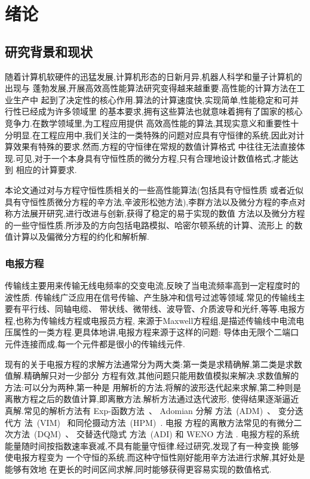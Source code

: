 \chapter{绪论}

\section{研究背景和现状}

随着计算机软硬件的迅猛发展,计算机形态的日新月异,机器人科学和量子计算机的出现与
蓬勃发展,开展高效高性能算法研究变得越来越重要.高性能的计算方法在工业生产中
起到了决定性的核心作用.算法的计算速度快,实现简单,性能稳定和可并行性已经成为许多领域里
的基本要求,拥有这些算法也就意味着拥有了国家的核心竞争力.在数学领域里,为工程应用提供
高效高性能的算法,其现实意义和重要性十分明显.在工程应用中,我们关注的一类特殊的问题对应具有守恒律的系统,因此对计算效果有特殊的要求.然而,方程的守恒律在常规的数值计算格式
中往往无法直接体现.可见,对于一个本身具有守恒性质的微分方程,只有合理地设计数值格式,才能达到
相应的计算要求.

本论文通过对与方程守恒性质相关的一些高性能算法(包括具有守恒性质
或者近似具有守恒性质微分方程的辛方法,辛波形松弛方法),李群方法以及微分方程的李点对称方法展开研究,进行改进与创新,获得了稳定的易于实现的数值
方法以及微分方程的一些守恒性质.所涉及的方向包括电路模拟、哈密尔顿系统的计算、流形上
的数值计算以及偏微分方程的约化和解析解.

\subsection{电报方程}

传输线主要用来传输无线电频率的交变电流,反映了当电流频率高到一定程度时的波性质.
传输线广泛应用在信号传输、产生脉冲和信号过滤等领域.常见的传输线主要有平行线、同轴电缆、
带状线、微带线、波导管、介质波导和光纤,等等.电报方程,也称为传输线方程或电报员方程,
来源于Maxwell方程组,是描述传输线中电流电压属性的一类方程.更具体地讲,电报方程来源于这样的问题:
导体由无限个二端口元件连接而成,每一个元件都是很小的传输线元件.

现有的关于电报方程的求解方法通常分为两大类:第一类是求精确解,第二类是求数值解.精确解只对一少部分
方程有效,其他问题只能用数值模拟来解决.求数值解的方法:可以分为两种,第一种是
用解析的方法,将解的波形迭代起来求解,第二种则是离散方程之后的数值计算,即离散方法.解析方法通过迭代波形,
使得结果逐渐逼近真解.常见的解析方法有 Exp-函数方法~\cite{naher2011exp}、 Adomian 分解
方法~(ADM)~\cite{adomian1988areview,sheikholeslami2012analytical}、 变分迭代方
法~(VIM)~\cite{wu2013variational} 和同伦摄动方法~(HPM)~\cite{sheikholeslami2012homotopy}. 电报
方程的离散方法常见的有微分二次方法~(DQM)~\cite{jiwari2012numerical}、 交替迭代隐式
方法~(ADI) \cite{cui2013convergence} 和 WENO 方法 \cite{borges2008improved,shen2014improvement}.
电报方程的系统能量随时间按指数速率衰减,不具有能量守恒律.经过研究,发现了有一种变换 \cite{polyanin2001handbook} 能够使电报方程变为
一个守恒的系统,而这种守恒性刚好能用辛方法进行求解,其好处是能够有效地
在更长的时间区间求解,同时能够获得更容易实现的数值格式.

